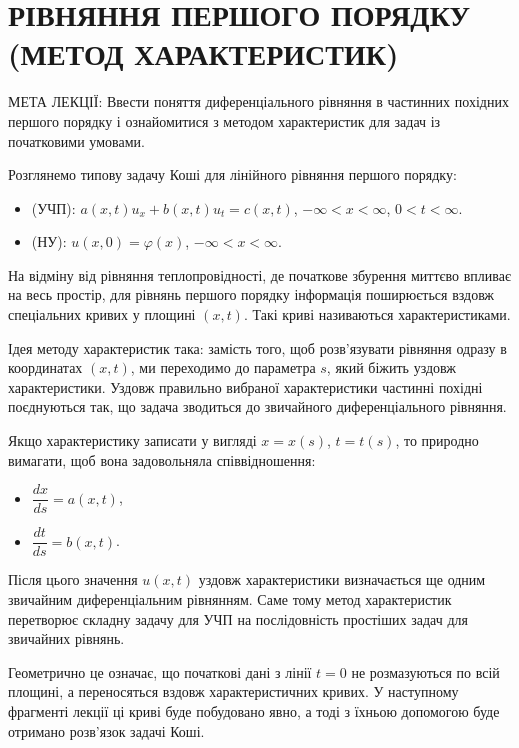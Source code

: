 \documentclass[
  ukrainian,
]{article}
\providecommand{\tightlist}{%
  \setlength{\itemsep}{0pt}\setlength{\parskip}{0pt}}
\begin{document}
\section{РІВНЯННЯ ПЕРШОГО ПОРЯДКУ (МЕТОД
ХАРАКТЕРИСТИК)}\label{ux440ux456ux432ux43dux44fux43dux43dux44f-ux43fux435ux440ux448ux43eux433ux43e-ux43fux43eux440ux44fux434ux43aux443-ux43cux435ux442ux43eux434-ux445ux430ux440ux430ux43aux442ux435ux440ux438ux441ux442ux438ux43a}

МЕТА ЛЕКЦІЇ: Ввести поняття диференціального рівняння в частинних
похідних першого порядку і ознайомитися з методом характеристик для
задач із початковими умовами.

Розглянемо типову задачу Коші для лінійного рівняння першого порядку:

\begin{itemize}
\tightlist
\item
  (УЧП): \(a(x,t)u_x + b(x,t)u_t = c(x,t)\), \(-\infty < x < \infty\),
  \(0 < t < \infty\).
\item
  (НУ): \(u(x,0) = \varphi(x)\), \(-\infty < x < \infty\).
\end{itemize}

На відміну від рівняння теплопровідності, де початкове збурення миттєво
впливає на весь простір, для рівнянь першого порядку інформація
поширюється вздовж спеціальних кривих у площині \((x,t)\). Такі криві
називаються характеристиками.

Ідея методу характеристик така: замість того, щоб розв'язувати рівняння
одразу в координатах \((x,t)\), ми переходимо до параметра \(s\), який
біжить уздовж характеристики. Уздовж правильно вибраної характеристики
частинні похідні поєднуються так, що задача зводиться до звичайного
диференціального рівняння.

Якщо характеристику записати у вигляді \(x=x(s)\), \(t=t(s)\), то
природно вимагати, щоб вона задовольняла співвідношення:

\begin{itemize}
\tightlist
\item
  \(\dfrac{dx}{ds} = a(x,t)\),
\item
  \(\dfrac{dt}{ds} = b(x,t)\).
\end{itemize}

Після цього значення \(u(x,t)\) уздовж характеристики визначається ще
одним звичайним диференціальним рівнянням. Саме тому метод характеристик
перетворює складну задачу для УЧП на послідовність простіших задач для
звичайних рівнянь.

Геометрично це означає, що початкові дані з лінії \(t=0\) не
розмазуються по всій площині, а переносяться вздовж характеристичних
кривих. У наступному фрагменті лекції ці криві буде побудовано явно, а
тоді з їхньою допомогою буде отримано розв'язок задачі Коші.
\end{document}

